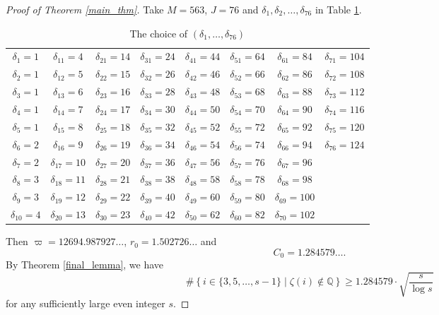 \documentclass[12pt]{article}
\numberwithin{equation}{section}
\begin{document}
\bigskip

\begin{proof}[Proof of Theorem \ref{main_thm}]
Take $M=563$, $J=76$ and $\delta_1,\delta_2,\ldots,\delta_{76}$ in Table \ref{table}.
\begin{table}[htbp]
	\centering
	\caption{The choice of $(\delta_1,\ldots,\delta_{76})$}
	\label{table}
	\begin{tabular}{|cccccccc|}
		\hline
		$\delta_1=1$ & $\delta_{11}=4$ & $\delta_{21}=14$ & $\delta_{31}=24$ & $\delta_{41}=44$ & $\delta_{51}=64$ & $\delta_{61}=84$ & $\delta_{71}=104$  \\
		$\delta_2=1$ & $\delta_{12}=5$ & $\delta_{22}=15$ &  $\delta_{32}=26$ & $\delta_{42}=46$ & $\delta_{52}=66$ & $\delta_{62}=86$ & $\delta_{72}=108$ \\
		$\delta_3=1$ & $\delta_{13}=6$ & $\delta_{23}=16$ & $\delta_{33}=28$ & $\delta_{43}=48$ & $\delta_{53}=68$ & $\delta_{63}=88$ & $\delta_{73}=112$ \\
		$\delta_4=1$ & $\delta_{14}=7$ & $\delta_{24}=17$ & $\delta_{34}=30$ & $\delta_{44}=50$ & $\delta_{54}=70$ & $\delta_{64}=90$ & $\delta_{74}=116$ \\
		$\delta_5=1$ & $\delta_{15}=8$ & $\delta_{25}=18$ & $\delta_{35}=32$ & $\delta_{45}=52$ & $\delta_{55}=72$ & $\delta_{65}=92$ & $\delta_{75}=120$ \\
		$\delta_6=2$ & $\delta_{16}=9$ & $\delta_{26}=19$ & $\delta_{36}=34$ & $\delta_{46}=54$ & $\delta_{56}=74$ & $\delta_{66}=94$ & $\delta_{76}=124$ \\
		$\delta_7=2$ & $\delta_{17}=10$ & $\delta_{27}=20$ & $\delta_{37}=36$ & $\delta_{47}=56$ & $\delta_{57}=76$ & $\delta_{67}=96$ &\\
		$\delta_8=3$ & $\delta_{18}=11$ & $\delta_{28}=21$ & $\delta_{38}=38$ & $\delta_{48}=58$ & $\delta_{58}=78$ & $\delta_{68}=98$ &\\
		$\delta_9=3$ & $\delta_{19}=12$ & $\delta_{29}=22$ & $\delta_{39}=40$ & $\delta_{49}=60$ & $\delta_{59}=80$ & $\delta_{69}=100$ &\\
		$\delta_{10}=4$ & $\delta_{20}=13$ & $\delta_{30}=23$ & $\delta_{40}=42$ & $\delta_{50}=62$ & $\delta_{60}=82$ & $\delta_{70}=102$ &\\
		\hline
	\end{tabular}
\end{table}

Then $\varpi = 12694.987927\ldots$, $r_0 = 1.502726\ldots$ and
\[ C_0 = 1.284579\ldots. \]
By Theorem \ref{final_lemma}, we have
\[ \# \left\{  i \in \{3,5,\ldots,s-1\}  \mid  \zeta(i) \not\in \mathbb{Q} \right\}  \geqslant 1.284579 \cdot \sqrt{\frac{s}{\log s}} \]
for any sufficiently large even integer $s$.
\end{proof}
\end{document}
